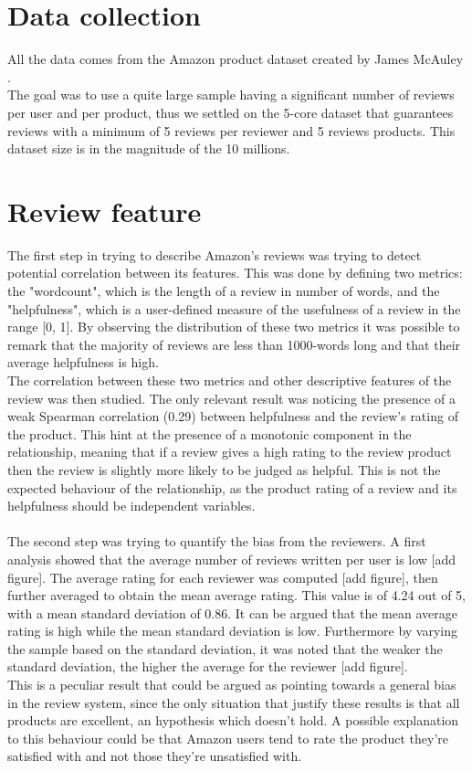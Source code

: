 \documentclass[11pt]{article}
\begin{document}
\section{Data collection}
All the data comes from the Amazon product dataset created by James McAuley \cite{mcauley2015image}.\\
 The goal was to use a quite large sample having a significant number of reviews per user and per product, thus we settled on the 5-core dataset that guarantees reviews with a minimum of 5 reviews per reviewer and 5 reviews products. This dataset size is in the magnitude of the 10 millions.
\section{Review feature}
    The first step in trying to describe Amazon's reviews was trying to detect potential correlation between its features. This was done by defining two metrics: the "wordcount", which is 
  the length of a review in number of words, and the "helpfulness", which is a user-defined measure of the usefulness of a review in the range [0, 1]. By observing the distribution of these two metrics it was possible to remark that the majority of reviews are less than 1000-words long and that their average helpfulness is high.\\ The correlation between these two metrics and  other descriptive features of the review was then studied. The only relevant result was noticing the presence of a weak Spearman correlation (0.29) between helpfulness and the review's rating of the product. This hint at the presence of a monotonic component in the relationship, meaning that if a review gives a high rating to the review product then the review is slightly more likely to be judged as helpful. This is not the expected behaviour of the relationship, as the product rating of a review and its helpfulness should be independent variables.\\\\
The second step was trying to quantify the bias from the reviewers. A first analysis showed that the average number of reviews written per user is low [add figure]. The average rating for each reviewer was computed [add figure], then further averaged to obtain the mean average rating. This value is of 4.24 out of 5, with a mean standard deviation of 0.86. It can be argued that the mean average rating is high while the mean standard deviation is low. Furthermore by varying the sample based on the standard deviation, it was noted that the weaker the standard deviation, the higher the average for the reviewer [add figure].\\ This is a peculiar result that could be argued as pointing towards a general bias in the review system, since the only situation that justify these results is that all products are excellent, an hypothesis which doesn't hold. A possible explanation to this behaviour could be that Amazon users  tend to rate the product they're satisfied with and not those they're unsatisfied with.\\\\
\end{document}

